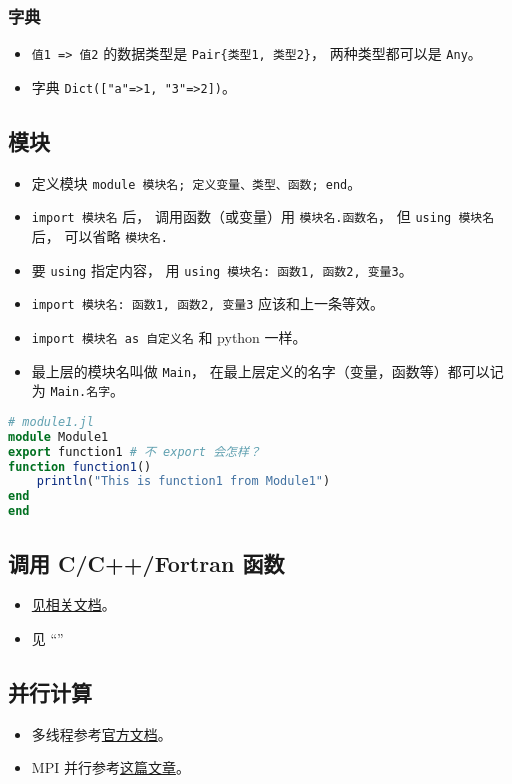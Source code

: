 \subsubsection{字典}
\begin{itemize}
\item \verb`值1 => 值2` 的数据类型是 \verb`Pair{类型1, 类型2}`， 两种类型都可以是 \verb`Any`。
\item 字典 \verb`Dict(["a"=>1, "3"=>2])`。
\end{itemize}

\subsection{模块}
\begin{itemize}
\item 定义模块 \verb`module 模块名; 定义变量、类型、函数; end`。
\item \verb`import 模块名` 后， 调用函数（或变量）用 \verb`模块名.函数名`， 但 \verb`using 模块名` 后， 可以省略 \verb`模块名.`
\item 要 \verb`using` 指定内容， 用 \verb`using 模块名: 函数1, 函数2, 变量3`。
\item \verb`import 模块名: 函数1, 函数2, 变量3` 应该和上一条等效。
\item \verb`import 模块名 as 自定义名` 和 python 一样。
\item 最上层的模块名叫做 \verb`Main`， 在最上层定义的名字（变量，函数等）都可以记为 \verb`Main.名字`。
\end{itemize}

\begin{lstlisting}[language=julia]
# module1.jl
module Module1
export function1 # 不 export 会怎样？
function function1()
    println("This is function1 from Module1")
end
end
\end{lstlisting}

\subsection{调用 C/C++/Fortran 函数}
\begin{itemize}
\item \href{https://docs.julialang.org/en/v1/manual/calling-c-and-fortran-code/}{见相关文档}。
\item 见 “”
\end{itemize}

\subsection{并行计算}
\begin{itemize}
\item 多线程参考\href{https://docs.julialang.org/en/v1/manual/multi-threading/}{官方文档}。
\item MPI 并行参考\href{http://www.claudiobellei.com/2018/09/30/julia-mpi/}{这篇文章}。
\end{itemize}

